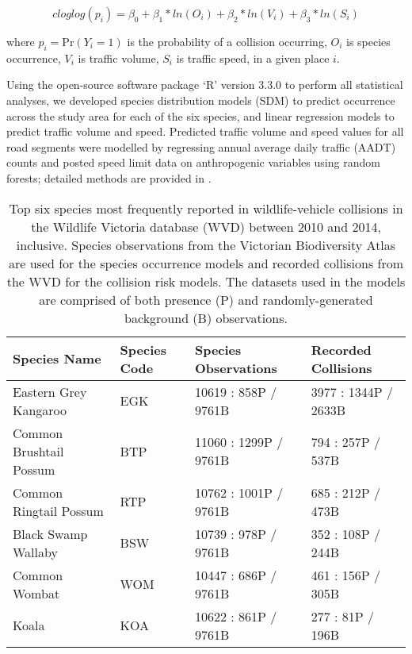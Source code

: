 \begin{equation}
cloglog(p_i) = \beta_0 + \beta_1*ln(O_i) + \beta_2*ln(V_i) + \beta_3*ln(S_i)
\end{equation}

\noindent where $p_i=\text{Pr}(Y_i=1)$ is the probability of a collision occurring, $O_i$ is species occurrence, $V_i$ is traffic volume, $S_i$ is traffic speed, in a given place $i$.

Using the open-source software package `R' version 3.3.0 \citep{rdct16} to perform all statistical analyses, we developed species distribution models (SDM) to predict occurrence across the study area for each of the six species, and linear regression models to predict traffic volume and speed. Predicted traffic volume and speed values for all road segments were modelled by regressing annual average daily traffic (AADT) counts and posted speed limit data on anthropogenic variables using random forests; detailed methods are provided in . 

\begin{table}[htp]
\caption{Top six species most frequently reported in wildlife-vehicle collisions in the Wildlife Victoria database (WVD) between 2010 and 2014, inclusive. Species observations from the Victorian Biodiversity Atlas are used for the species occurrence models and recorded collisions from the WVD for the collision risk models. The datasets used in the models are comprised of both presence (P) and randomly-generated background (B) observations.}
\begin{tabularx}{\textwidth}{llll} \toprule
Species Name                     &Species Code     &Species Observations     &Recorded Collisions \\ \midrule 
Eastern Grey Kangaroo 	& EGK	& 10619 : 858P / 9761B 	& 3977 : 1344P / 2633B \\ 
Common Brushtail Possum & BTP	& 11060 : 1299P / 9761B	& 794 : 257P / 537B \\ 
Common Ringtail Possum 	& RTP	& 10762 : 1001P / 9761B	& 685 : 212P / 473B \\ 
Black Swamp Wallaby 	& BSW	& 10739 : 978P / 9761B 	& 352 : 108P / 244B \\ 
Common Wombat 			& WOM	& 10447 : 686P / 9761B 	& 461 : 156P / 305B \\ 
Koala 					& KOA 	& 10622 : 861P / 9761B 	& 277 : 81P / 196B \\ 
\bottomrule
\end{tabularx}
\label{6sp_species_data}
\end{table}

